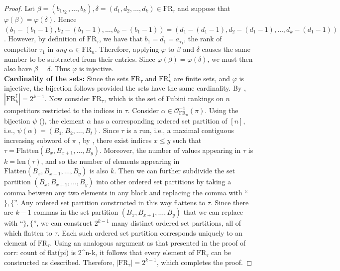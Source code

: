 \documentclass{amsart}
\newcommand{\Flatten}[0]{\mathrm{Flatten}}
\theoremstyle{definition}
\theoremstyle{definition}
\theoremstyle{remark}
\newcommand{\FR}[1]{\mathrm{FR}_{#1}}
\newcommand{\out}{\mathcal{O}}
\newcommand{\len}{\mathrm{len}}
\begin{document}
\begin{proof}
    Let $\beta=(b_1,_2,\ldots,b_k), \delta=(d_1,d_2,\ldots,d_k) \in \FR{\tau}$ and suppose that $\varphi(\beta) = \varphi(\delta)$.  Hence $(b_1-(b_1-1), b_2-(b_1-1), \ldots, b_k - (b_1-1)) = (d_1-(d_1-1), d_2-(d_1-1), \ldots, d_k - (d_1-1))$. However, by definition of $\FR{\tau}$, we have that $b_1 = d_1 = a_{\tau_1}$, the rank of competitor $\tau_1$ in \textit{any} $\alpha \in \FR{n}$. 
    Therefore, applying $\varphi$ to $\beta$ and $\delta$ causes the same number to be subtracted from their entries. Since $\varphi(\beta) = \varphi(\delta)$, we must then also have $\beta = \delta$. Thus $\varphi$ is injective.\\ 
    
\noindent \textbf{Cardinality of the sets:} Since the sets $\FR{\tau}$ and $\FR{k}^\uparrow$ 
are finite sets, and $\varphi$ is injective, the bijection follows provided the sets have the same cardinality.
By , $|\FR{k}^\uparrow|=2^{k-1}$.
Now consider $\FR{\tau}$, which is the set of Fubini rankings on $n$ competitors  restricted to the indices in $\tau$. 
Consider $\alpha\in\out_{\FR{n}}^{-1}(\pi)$. 
Using the bijection $\psi$ (), the element $\alpha$ has a corresponding ordered set partition of $[n]$, i.e.,
$\psi(\alpha)=(B_1,B_2,\ldots,B_t)$. 
Since $\tau$ is a run, i.e., a maximal contiguous increasing subword of $\pi$ 
, by , 
there exist indices $x\leq y$  such that 
$\tau=\Flatten(B_x,B_{x+1},\ldots,B_y)$. 
Moreover, the number of values appearing in $\tau$ is $k=\len(\tau)$, and so the number of elements appearing in $\Flatten(B_x,B_{x+1},\ldots,B_y)$ is also $k$. Then we can further subdivide the set partition $(B_x,B_{x+1},\ldots,B_y)$ into other ordered set partitions by taking a comma between any two elements in any block and replacing the comma with ``$\},\{$''. 
Any ordered set partition constructed in this way flattens to $\tau$.
Since there are $k-1$ commas in the set partition $(B_x,B_{x+1},\ldots,B_y)$ that we can replace with ``$\},\{$'', we can construct $2^{k-1}$ many distinct ordered set partitions, all of which flatten to $\tau$. 
Each such ordered set partition corresponds uniquely to an element of $\FR{\tau}$. 
Using an analogous argument as that presented in the proof of \Cref
{corr: count of flat(pi) is 2^n-k}, it follows that every element of $\FR{\tau}$ can be constructed as described. 
Therefore, $|\FR{\tau}|=2^{k-1}$, which completes the proof.
\qedhere
    
\end{proof}
\end{document}
